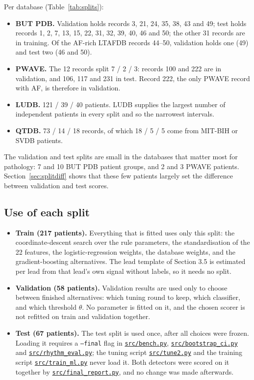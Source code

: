 \documentclass[11pt,a4paper]{article}
\newcommand{\code}[1]{\texttt{#1}}
\newcommand{\repourl}{https://github.com/BierschneiderEmanuel/pWaveDetection}
\newcommand{\repofile}[2]{\href{\repourl/blob/main/#2}{\code{#1}}}
\begin{document}
Per database (Table~\ref{tab:splits}):
\begin{itemize}
\item \textbf{BUT PDB.} Validation holds records 3, 21, 24, 35, 38, 43 and 49; test holds records 1, 2, 7, 13, 15, 22, 31, 32, 39, 40, 46 and 50; the other 31 records are in training. Of the AF-rich LTAFDB records 44--50, validation holds one (49) and test two (46 and 50).
\item \textbf{PWAVE.} The 12 records split 7 / 2 / 3: records 100 and 222 are in validation, and 106, 117 and 231 in test. Record 222, the only PWAVE record with AF, is therefore in validation.
\item \textbf{LUDB.} 121 / 39 / 40 patients. LUDB supplies the largest number of independent patients in every split and so the narrowest intervals.
\item \textbf{QTDB.} 73 / 14 / 18 records, of which 18 / 5 / 5 come from MIT-BIH or SVDB patients.
\end{itemize}
The validation and test splits are small in the databases that matter most for pathology: 7 and 10 BUT PDB patient groups, and 2 and 3 PWAVE patients. Section~\ref{sec:splitdiff} shows that these few patients largely set the difference between validation and test scores.

\subsection{Use of each split}
\label{sec:splituse}

\begin{itemize}
\item \textbf{Train (217 patients).} Everything that is fitted uses only this split: the coordinate-descent search over the rule parameters, the standardisation of the 22 features, the logistic-regression weights, the database weights, and the gradient-boosting alternatives. The lead template of Section 3.5 is estimated per lead from that lead's own signal without labels, so it needs no split.
\item \textbf{Validation (58 patients).} Validation results are used only to choose between finished alternatives: which tuning round to keep, which classifier, and which threshold $\theta$. No parameter is fitted on it, and the chosen scorer is not refitted on train and validation together.
\item \textbf{Test (67 patients).} The test split is used once, after all choices were frozen. Loading it requires a \code{--final} flag in \repofile{src/bench.py}{src/bench.py}, \repofile{src/bootstrap\_ci.py}{src/bootstrap_ci.py} and \repofile{src/rhythm\_eval.py}{src/rhythm_eval.py}; the tuning script \repofile{src/tune2.py}{src/tune2.py} and the training script \repofile{src/train\_ml.py}{src/train_ml.py} never load it. Both detectors were scored on it together by \repofile{src/final\_report.py}{src/final_report.py}, and no change was made afterwards.
\end{itemize}
\end{document}

